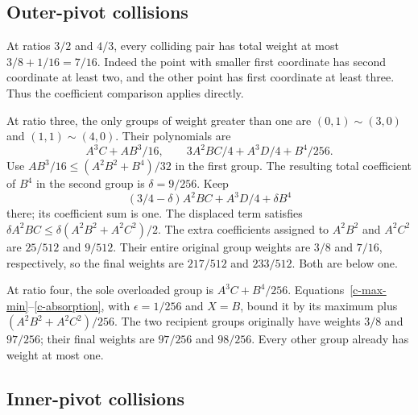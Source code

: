 \subsection{Outer-pivot collisions}

At ratios $3/2$ and $4/3$, every colliding pair has total weight at most
$3/8+1/16=7/16$.  Indeed the point with smaller first coordinate has
second coordinate at least two, and the other point has first coordinate
at least three.  Thus the coefficient comparison applies directly.

At ratio three, the only groups of weight greater than one are
$(0,1)\sim(3,0)$ and $(1,1)\sim(4,0)$.  Their polynomials are
\[
 A^3C+AB^3/16,\qquad
 3A^2BC/4+A^3D/4+B^4/256.
\]
Use $AB^3/16\le(A^2B^2+B^4)/32$ in the first group.  The resulting
total coefficient of $B^4$ in the second group is $\delta=9/256$.
Keep
\[
 (3/4-\delta)A^2BC+A^3D/4+\delta B^4
\]
there; its coefficient sum is one.  The displaced term satisfies
$\delta A^2BC\le\delta(A^2B^2+A^2C^2)/2$.
The extra coefficients assigned to $A^2B^2$ and $A^2C^2$ are
$25/512$ and $9/512$.  Their entire original group weights are
$3/8$ and $7/16$, respectively, so the final weights are
$217/512$ and $233/512$.  Both are below one.

At ratio four, the sole overloaded group is $A^3C+B^4/256$.
Equations~\eqref{c-max-min}--\eqref{c-absorption}, with
$\epsilon=1/256$ and $X=B$, bound it by its maximum plus
$(A^2B^2+A^2C^2)/256$.  The two recipient groups originally have weights
$3/8$ and $97/256$; their final weights are $97/256$ and $98/256$.
Every other group already has weight at most one.

\subsection{Inner-pivot collisions}

